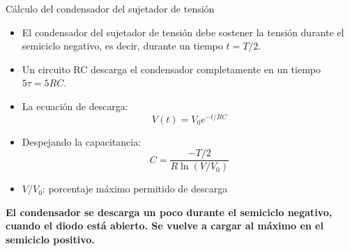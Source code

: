 \documentclass[t,aspectratio=169]{beamer}
\begin{document}
\begin{frame}{Cálculo del condensador del sujetador de tensión}

\begin{itemize}
    \item El condensador del sujetador de tensión debe sostener la tensión durante el semiciclo negativo, es decir, durante un tiempo $t = T/2$.
    \item Un circuito RC descarga el condensador completamente en un tiempo $5\tau = 5RC$.
    \item La ecuación de descarga:
    \[ V(t) = V_0 e^{-t/RC} \]
    \item Despejando la capacitancia:
    \[ C = \dfrac{-T/2}{R \ln (V/V_0)} \]
    \item $V/V_0$: porcentaje máximo permitido de descarga
\end{itemize}

\textbf{El condensador se descarga un poco durante el semiciclo negativo, cuando el diodo está abierto. Se vuelve a cargar al máximo en el semiciclo positivo.}

\end{frame}
\end{document}
